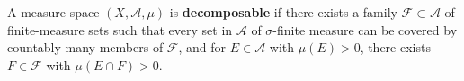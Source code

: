 A measure space $(X, \mathcal{A}, \mu)$ is \textbf{decomposable} if there exists a family $\mathcal{F} \subset \mathcal{A}$ of finite-measure sets such that every set in $\mathcal{A}$ of $\sigma$-finite measure can be covered by countably many members of $\mathcal{F}$, and for $E \in \mathcal{A}$ with $\mu(E) > 0$, there exists $F \in \mathcal{F}$ with $\mu(E \cap F) > 0$.
